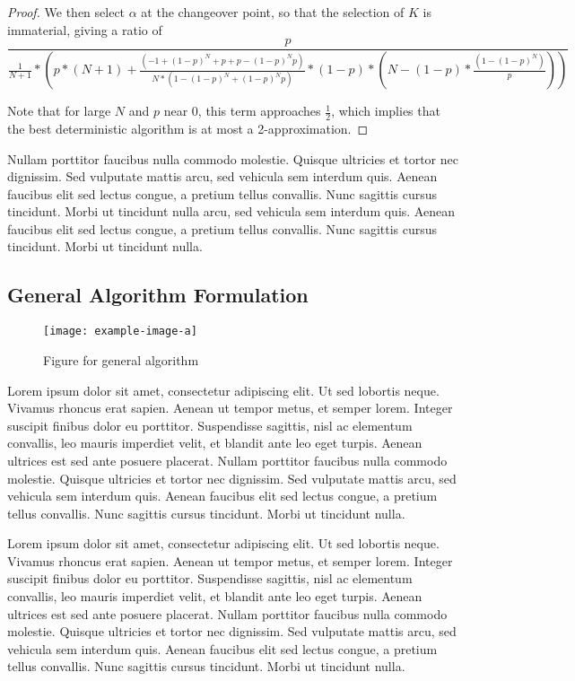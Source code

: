 \begin{proof}
    We then select $\alpha$ at the changeover point, so that the selection of $K$ is immaterial, giving a ratio of 
    \begin{equation}
        \frac{p}{\frac{1}{N+1}*\left(p*\left(N+1\right)+\frac{\left(-1+\left(1-p\right)^{N}+p+p-\left(1-p\right)^{N}p\right)}{N*\left(1-\left(1-p\right)^{N}+\left(1-p\right)^{N}p\right)}*\left(1-p\right)*\left(N-\left(1-p\right)*\frac{\left(1-\left(1-p\right)^{N}\right)}{p}\right)\right)}
    \end{equation}

    Note that for large $N$ and $p$ near 0, this term approaches $\frac{1}{2}$, which implies that the best deterministic algorithm is at most a 2-approximation. 
\end{proof}

 Nullam porttitor faucibus nulla commodo molestie. Quisque ultricies et tortor nec dignissim. Sed vulputate mattis arcu, sed vehicula sem interdum quis. Aenean faucibus elit sed lectus congue, a pretium tellus convallis. Nunc sagittis cursus tincidunt. Morbi ut tincidunt nulla arcu, sed vehicula sem interdum quis. Aenean faucibus elit sed lectus congue, a pretium tellus convallis. Nunc sagittis cursus tincidunt. Morbi ut tincidunt nulla.

\subsection{General Algorithm Formulation}
 \begin{figure*}
     \centering 
     \texttt{[image: example-image-a]}
     \caption{Figure for general algorithm}
 \end{figure*}


 Lorem ipsum dolor sit amet, consectetur adipiscing elit. Ut sed lobortis neque. Vivamus rhoncus erat sapien. Aenean ut tempor metus, et semper lorem. Integer suscipit finibus dolor eu porttitor. Suspendisse sagittis, nisl ac elementum convallis, leo mauris imperdiet velit, et blandit ante leo eget turpis. Aenean ultrices est sed ante posuere placerat. Nullam porttitor faucibus nulla commodo molestie. Quisque ultricies et tortor nec dignissim. Sed vulputate mattis arcu, sed vehicula sem interdum quis. Aenean faucibus elit sed lectus congue, a pretium tellus convallis. Nunc sagittis cursus tincidunt. Morbi ut tincidunt nulla.

 Lorem ipsum dolor sit amet, consectetur adipiscing elit. Ut sed lobortis neque. Vivamus rhoncus erat sapien. Aenean ut tempor metus, et semper lorem. Integer suscipit finibus dolor eu porttitor. Suspendisse sagittis, nisl ac elementum convallis, leo mauris imperdiet velit, et blandit ante leo eget turpis. Aenean ultrices est sed ante posuere placerat. Nullam porttitor faucibus nulla commodo molestie. Quisque ultricies et tortor nec dignissim. Sed vulputate mattis arcu, sed vehicula sem interdum quis. Aenean faucibus elit sed lectus congue, a pretium tellus convallis. Nunc sagittis cursus tincidunt. Morbi ut tincidunt nulla.

